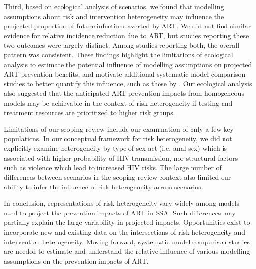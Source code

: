 Third, based on ecological analysis of scenarios, we found that
modelling assumptions about risk and intervention heterogeneity
may influence the projected proportion of future infections averted by ART.
We did not find similar evidence for relative incidence reduction due to ART,
but studies reporting these two outcomes were largely distinct.
Among studies reporting both, the overall pattern was consistent.
These findings highlight the limitations of ecological analysis to estimate
the potential influence of modelling assumptions on projected ART prevention benefits,
and motivate additional systematic model comparison studies to better quantify this influence,
such as those by \citet{Dodd2010,Hontelez2013}.
Our ecological analysis also suggested that the anticipated ART prevention impacts from homogeneous models
may be achievable in the context of risk heterogeneity
if testing and treatment resources are prioritized to higher risk groups.

Limitations of our scoping review include our examination of only a few key populations.
In our conceptual framework for risk heterogeneity, we did not explicitly examine heterogeneity
by type of sex act (i.e. anal sex) which is associated with higher probability of HIV transmission,
nor structural factors such as violence which lead to increased HIV risks.
The large number of differences between scenarios in the scoping review context
also limited our ability to infer the influence of risk heterogeneity across scenarios.

In conclusion, representations of risk heterogeneity vary widely
among models used to project the prevention impacts of ART in SSA.
Such differences may partially explain the large variability in projected impacts.
Opportunities exist to incorporate new and existing data on
the intersections of risk heterogeneity and intervention heterogeneity.
Moving forward, systematic model comparison studies are needed to
estimate and understand the relative influence of various modelling assumptions on the prevention impacts of ART.
